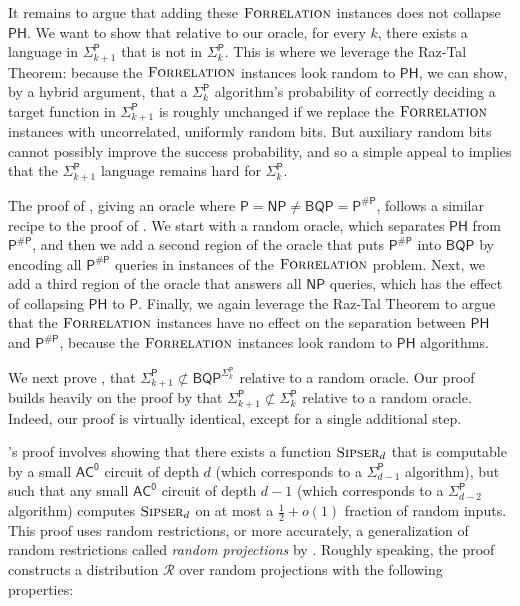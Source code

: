\documentclass[10pt,a4paper]{article}
\newcommand{\Sipser}{\normalfont\textsc{Sipser}}
\newcommand{\Forrelation}{\normalfont\textsc{Forrelation}}
\begin{document}
It remains to argue that adding these $\Forrelation$ instances does not collapse $\mathsf{PH}$. We want to show that relative to our oracle, for every $k$, there exists a language in $\mathsf{\Sigma}_{k+1}^\mathsf{P}$ that is not in $\mathsf{\Sigma}_{k}^\mathsf{P}$. This is where we leverage the Raz-Tal Theorem: because the $\Forrelation$ instances look random to $\mathsf{PH}$, we can show, by a hybrid argument, that a $\mathsf{\Sigma}_{k}^\mathsf{P}$ algorithm's probability of correctly deciding a target function in $\mathsf{\Sigma}_{k+1}^\mathsf{P}$ is roughly unchanged if we replace the $\Forrelation$ instances with uncorrelated, uniformly random bits. But auxiliary random bits cannot possibly improve the success probability, and so a simple appeal to \cite{HRST17} implies that the $\mathsf{\Sigma}_{k+1}^\mathsf{P}$ language remains hard for $\mathsf{\Sigma}_{k}^\mathsf{P}$.

\bigskip

The proof of , giving an oracle where $\mathsf{P} = \mathsf{NP} \neq \mathsf{BQP} = \mathsf{P^{\# P}}$, follows a similar recipe to the proof of . We start with a random oracle, which separates $\mathsf{PH}$ from $\mathsf{P^{\# P}}$, and then we add a second region of the oracle that puts $\mathsf{P^{\# P}}$ into $\mathsf{BQP}$ by encoding all $\mathsf{P^{\# P}}$ queries in instances of the $\Forrelation$ problem. Next, we add a third region of the oracle that answers all $\mathsf{NP}$ queries, which has the effect of collapsing $\mathsf{PH}$ to $\mathsf{P}$. Finally, we again leverage the Raz-Tal Theorem to argue that the $\Forrelation$ instances have no effect on the separation between $\mathsf{PH}$ and $\mathsf{P^{\# P}}$, because the $\Forrelation$ instances look random to $\mathsf{PH}$ algorithms.

\bigskip

We next prove , that $\mathsf{\Sigma}_{k+1}^\mathsf{P} \not\subset \mathsf{BQP}^{\mathsf{\Sigma}_{k}^\mathsf{P}}$ relative to a random oracle. Our proof builds heavily on the proof by \cite{HRST17} that $\mathsf{\Sigma}_{k+1}^\mathsf{P} \not\subset \mathsf{\Sigma}_{k}^\mathsf{P}$ relative to a random oracle. Indeed, our proof is virtually identical, except for a single additional step.

\cite{HRST17}'s proof involves showing that there exists a function $\Sipser_{d}$ that is computable by a small $\mathsf{AC^0}$ circuit of depth $d$ (which corresponds to a $\mathsf{\Sigma}_{d-1}^\mathsf{P}$ algorithm), but such that any small $\mathsf{AC^0}$ circuit of depth $d-1$ (which corresponds to a $\mathsf{\Sigma}_{d-2}^\mathsf{P}$ algorithm) computes $\Sipser_{d}$ on at most a $\frac{1}{2} + o(1)$ fraction of random inputs. This proof uses random restrictions, or more accurately, a generalization of random restrictions called \textit{random projections} by \cite{HRST17}. Roughly speaking, the proof constructs a distribution $\mathcal{R}$ over random projections with the following properties:
\end{document}
